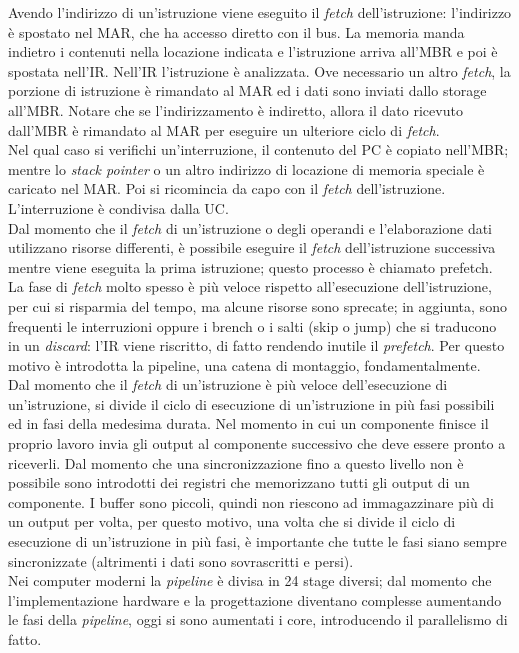 \documentclass{article}
\begin{document}
Avendo l'indirizzo di un'istruzione viene eseguito il \textit{fetch} dell'istruzione: l'indirizzo è spostato nel MAR, che ha accesso diretto con il bus. La memoria manda indietro i contenuti nella locazione indicata e l'istruzione arriva all'MBR e poi è spostata nell'IR.
Nell'IR l'istruzione è analizzata. Ove necessario un altro \textit{fetch}, la porzione di istruzione è rimandato al MAR ed i dati sono inviati dallo storage all'MBR. Notare che se l'indirizzamento è indiretto, allora il dato ricevuto dall'MBR è rimandato al MAR per eseguire un ulteriore ciclo di \textit{fetch}.\\
Nel qual caso si verifichi un'interruzione, il contenuto del PC è copiato nell'MBR; mentre lo \textit{stack pointer} o un altro indirizzo di locazione di memoria speciale è caricato nel MAR. Poi si ricomincia da capo con il \textit{fetch} dell'istruzione. L'interruzione è condivisa dalla UC.\\
Dal momento che il \textit{fetch} di un'istruzione o degli operandi e l'elaborazione dati utilizzano risorse differenti, è possibile eseguire il \textit{fetch} dell'istruzione successiva mentre viene eseguita la prima istruzione; questo processo è chiamato prefetch. La fase di \textit{fetch} molto spesso è più veloce rispetto all'esecuzione dell'istruzione, per cui si risparmia del tempo, ma alcune risorse sono sprecate; in aggiunta, sono frequenti le interruzioni oppure i brench o i salti (skip o jump) che si traducono in un \textit{discard}: l'IR viene riscritto, di fatto rendendo inutile il \textit{prefetch}. Per questo motivo è introdotta la pipeline, una catena di montaggio, fondamentalmente. \\
Dal momento che il \textit{fetch} di un'istruzione è più veloce dell'esecuzione di un'istruzione, si divide il ciclo di esecuzione di un'istruzione in più fasi possibili ed in fasi della medesima durata. Nel momento in cui un componente finisce il proprio lavoro invia gli output al componente successivo che deve essere pronto a riceverli. Dal momento che una sincronizzazione fino a questo livello non è possibile sono introdotti dei registri che memorizzano tutti gli output di un componente. I buffer sono piccoli, quindi non riescono ad immagazzinare più di un output per volta, per questo motivo, una volta che si divide il ciclo di esecuzione di un'istruzione in più fasi, è importante che tutte le fasi siano sempre sincronizzate (altrimenti i dati sono sovrascritti e persi). \\
Nei computer moderni la \textit{pipeline} è divisa in 24 stage diversi; dal momento che l'implementazione hardware e la progettazione diventano complesse aumentando le fasi della \textit{pipeline}, oggi si sono aumentati i core, introducendo il parallelismo di fatto. \\
\end{document}
